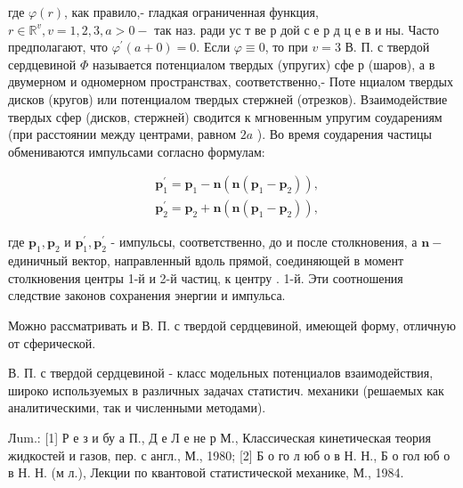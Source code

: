 \documentclass[10pt]{article}
\begin{document}
где $\varphi(r)$, как правило,- гладкая ограниченная функция, $r \in \mathbb{R}^{v}, v=1,2,3, a>0-$ так наз. ради ус т ве р дой с е р д ц е в и ны. Часто предполагают, что $\varphi^{\prime}(a+0)=0$. Если $\varphi \equiv 0$, то при $v=3$ В. П. с твердой сердцевиной $\Phi$ называется потенциалом твердых (упругих) сфе р (шаров), а в двумерном и одномерном пространствах, соответственно,- Поте нциалом твердых дисков (кругов) или потенциалом твердых стержней (отрезков). Взаимодействие твердых сфер (дисков, стержней) сводится к мгновенным упругим соударениям (при расстоянии между центрами, равном $2 a$ ). Во время соударения частицы обмениваются импульсами согласно формулам:



\[

\begin{aligned}

& \boldsymbol{p}_{1}^{\prime}=\boldsymbol{p}_{1}-\boldsymbol{n}\left(\boldsymbol{n}\left(\boldsymbol{p}_{1}-\boldsymbol{p}_{2}\right)\right), \\

& \boldsymbol{p}_{2}^{\prime}=\boldsymbol{p}_{2}+\boldsymbol{n}\left(\boldsymbol{n}\left(\boldsymbol{p}_{1}-\boldsymbol{p}_{2}\right)\right),

\end{aligned}

\]



где $\boldsymbol{p}_{1}, \boldsymbol{p}_{2}$ и $\boldsymbol{p}_{1}^{\prime}, \boldsymbol{p}_{2}^{\prime}$ - импульсы, соответственно, до и после столкновения, а $\boldsymbol{n}-$ единичный вектор, направленный вдоль прямой, соединяющей в момент столкновения центры 1-й и 2-й частиц, к центру . 1-й. Эти соотношения следствие законов сохранения энергии и импульса.



Можно рассматривать и В. П. с твердой сердцевиной, имеющей форму, отличную от сферической.



В. П. с твердой сердцевиной - класс модельных потенциалов взаимодействия, широко используемых в различных задачах статистич. механики (решаемых как аналитическими, так и численными методами).



Лum.: [1] Р е з и бу а П., Д е Л е не р М., Классическая кинетическая теория жидкостей и газов, пер. с англ., М., 1980; [2] Б о го л юб о в Н. Н., Б о гол юб о в Н. Н. (м л.), Лекции по квантовой статистической механике, М., 1984.
\end{document}
